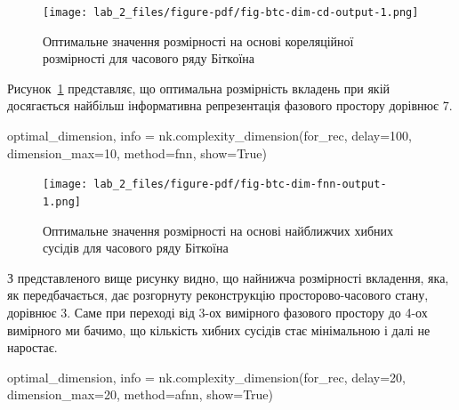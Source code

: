 \documentclass[
  letterpaper,
]{report}
\newenvironment{Shaded}{\begin{snugshade}}{\end{snugshade}}
\newcommand{\DecValTok}[1]{\textcolor[rgb]{0.68,0.00,0.00}{#1}}
\newcommand{\NormalTok}[1]{\textcolor[rgb]{0.00,0.23,0.31}{#1}}
\newcommand{\OperatorTok}[1]{\textcolor[rgb]{0.37,0.37,0.37}{#1}}
\newcommand{\StringTok}[1]{\textcolor[rgb]{0.13,0.47,0.30}{#1}}
\newcommand{\VariableTok}[1]{\textcolor[rgb]{0.07,0.07,0.07}{#1}}
\begin{document}
\begin{figure}[H]

{\centering \texttt{[image: lab\_2\_files/figure-pdf/fig-btc-dim-cd-output-1.png]}

}

\caption{\label{fig-btc-dim-cd}Оптимальне значення розмірності на основі
кореляційної розмірності для часового ряду Біткоїна}

\end{figure}

Рисунок~\ref{fig-btc-dim-cd} представляє, що оптимальна розмірність
вкладень при якій досягається найбільш інформативна репрезентація
фазового простору дорівнює 7.

\begin{Shaded}
\begin{Highlighting}[]
\NormalTok{optimal\_dimension, info }\OperatorTok{=}\NormalTok{ nk.complexity\_dimension(for\_rec,}
\NormalTok{                                                  delay}\OperatorTok{=}\DecValTok{100}\NormalTok{,}
\NormalTok{                                                  dimension\_max}\OperatorTok{=}\DecValTok{10}\NormalTok{,}
\NormalTok{                                                  method}\OperatorTok{=}\StringTok{\textquotesingle{}fnn\textquotesingle{}}\NormalTok{,}
\NormalTok{                                                  show}\OperatorTok{=}\VariableTok{True}\NormalTok{)}
\end{Highlighting}
\end{Shaded}

\begin{figure}[H]

{\centering \texttt{[image: lab\_2\_files/figure-pdf/fig-btc-dim-fnn-output-1.png]}

}

\caption{\label{fig-btc-dim-fnn}Оптимальне значення розмірності на
основі найближчих хибних сусідів для часового ряду Біткоїна}

\end{figure}

З представленого вище рисунку видно, що найнижча розмірності вкладення,
яка, як передбачається, дає розгорнуту реконструкцію просторово-часового
стану, дорівнює 3. Саме при переході від 3-ох вимірного фазового
простору до 4-ох вимірного ми бачимо, що кількість хибних сусідів стає
мінімальною і далі не наростає.

\begin{Shaded}
\begin{Highlighting}[]
\NormalTok{optimal\_dimension, info }\OperatorTok{=}\NormalTok{ nk.complexity\_dimension(for\_rec,}
\NormalTok{                                                  delay}\OperatorTok{=}\DecValTok{20}\NormalTok{,}
\NormalTok{                                                  dimension\_max}\OperatorTok{=}\DecValTok{20}\NormalTok{,}
\NormalTok{                                                  method}\OperatorTok{=}\StringTok{\textquotesingle{}afnn\textquotesingle{}}\NormalTok{,}
\NormalTok{                                                  show}\OperatorTok{=}\VariableTok{True}\NormalTok{)}
\end{Highlighting}
\end{Shaded}
\end{document}
